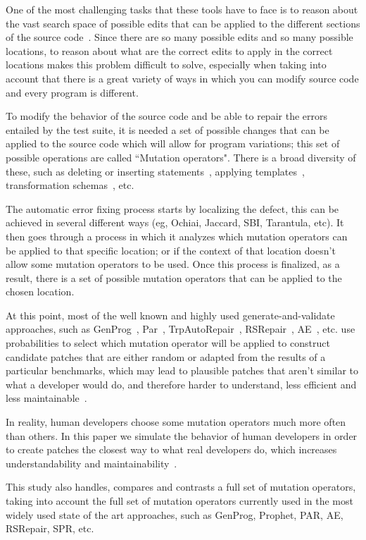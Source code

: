 \documentclass[conference]{IEEEtran}
\begin{document}
One 
of the most challenging tasks that 
these tools have to face is to reason about the vast search space of possible 
edits that can be applied to the different sections of the source 
code~\cite{long16}. Since 
there are so many possible edits and so many possible locations, to reason about 
what are the correct edits to apply in the correct locations makes this problem 
difficult to solve, especially when taking into account that there is a 
great variety of ways in which you can modify source code and every program is 
different. 

To modify the behavior of the source code and be able to repair the 
errors entailed by the test suite, it is needed a set of possible changes that 
can be applied to the source code which will allow for program variations; this 
set of possible operations are called ``Mutation operators". There is a broad diversity of these, such as deleting or inserting statements~\cite{legoues12}, applying templates~\cite{kim2013}, transformation schemas~\cite{fan15}, etc.

The automatic error fixing process starts by localizing the defect, this can be achieved in several different ways (eg, Ochiai, Jaccard, SBI, Tarantula, etc). It then goes through a process in which it analyzes which mutation operators can
be applied to that specific location; or if the context of that location doesn't
allow some mutation operators to be used. Once this process is finalized, as a result, there is a set of possible 
mutation operators that
can be applied to the chosen location. 

At this point, most of the well known and highly 
used generate-and-validate approaches, such as GenProg~\cite{legoues12}, 
Par~\cite{kim2013}, TrpAutoRepair~\cite{Qi13}, RSRepair~\cite{Qi14}, AE~\cite{Weimer13}, etc. use probabilities to select which mutation operator will be applied to construct candidate patches that are either random or adapted from the results of a particular benchmarks, which may lead to plausible patches that aren't similar to what a developer would do, and therefore harder to understand, less efficient and less maintainable~\cite{Qi15}.

In reality, human developers choose some mutation operators 
much more often than 
others. In this paper we simulate the behavior of human developers in order 
to create patches the closest way to what real developers do, which increases understandability and maintainability~\cite{kim2013}.

This study also 
handles, compares and contrasts a full set of mutation operators, taking into
account the full set of mutation operators currently used in the most widely used state of the art approaches, such as GenProg, Prophet, PAR, AE, RSRepair, SPR, etc.
\end{document}
